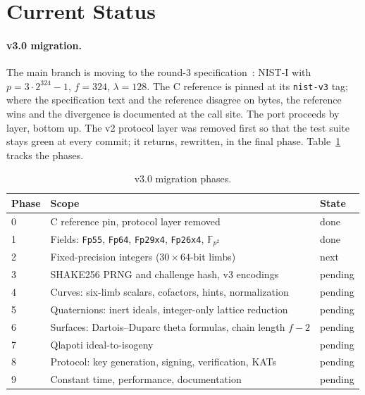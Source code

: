 \section{Current Status}
\label{sec:status}

\paragraph{v3.0 migration.}
The main branch is moving to the round-3
specification~\cite{sqisign-spec-v3.0}: NIST-I with
$p = 3\cdot 2^{324}-1$, $f = 324$, $\lambda = 128$.  The C reference is
pinned at its \texttt{nist-v3} tag; where the specification text and
the reference disagree on bytes, the reference wins and the divergence
is documented at the call site.  The port proceeds by layer, bottom
up.  The v2 protocol layer was removed first so that the test suite
stays green at every commit; it returns, rewritten, in the final
phase.  Table~\ref{tab:v3-phases} tracks the phases.

\begin{table}[h]
  \centering
  \begin{tabular}{lll}
    \toprule
    Phase & Scope & State \\
    \midrule
    0 & C reference pin, protocol layer removed & done \\
    1 & Fields: \texttt{Fp55}, \texttt{Fp64}, \texttt{Fp29x4}, \texttt{Fp26x4}, $\mathbb{F}_{p^2}$ & done \\
    2 & Fixed-precision integers ($30 \times 64$-bit limbs) & next \\
    3 & SHAKE256 PRNG and challenge hash, v3 encodings & pending \\
    4 & Curves: six-limb scalars, cofactors, hints, normalization & pending \\
    5 & Quaternions: inert ideals, integer-only lattice reduction & pending \\
    6 & Surfaces: Dartois--Duparc theta formulas, chain length $f-2$ & pending \\
    7 & Qlapoti ideal-to-isogeny & pending \\
    8 & Protocol: key generation, signing, verification, KATs & pending \\
    9 & Constant time, performance, documentation & pending \\
    \bottomrule
  \end{tabular}
  \caption{v3.0 migration phases.}
  \label{tab:v3-phases}
\end{table}

